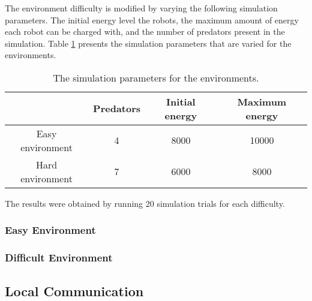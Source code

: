 The environment difficulty is modified by varying the following simulation parameters.
The initial energy level the robots, the maximum amount of energy each robot can be charged with, and the number of predators present in the simulation.
Table \ref{tab-environment} presents the simulation parameters that are varied for the environments.

\begin{table}[H]
	\centering
	\label{tab-environment}
	\begin{tabular}{|c|c|c|c|}
		\hline  & Predators & Initial energy & Maximum energy \\ 
		\hline Easy environment & 4 & 8000 & 10000 \\ 
		\hline Hard environment & 7 & 6000 & 8000 \\ 
		\hline 
		
	\end{tabular} 
	\caption{The simulation parameters for the environments.}
\end{table}

The results were obtained by running 20 simulation trials for each difficulty.
\subsubsection{Easy Environment}

\newpage



\newpage


\subsubsection{Difficult Environment}

\newpage



\newpage

\subsection{Local Communication}

































